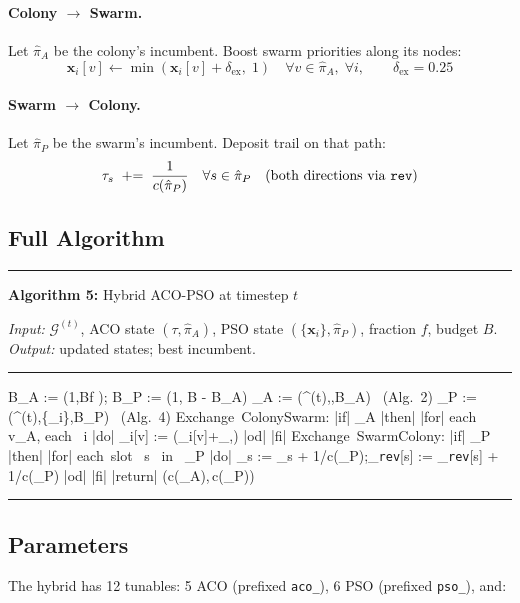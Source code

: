 \documentclass[11pt,a4paper]{article}
\theoremstyle{definition}
\newcommand{\calG}{\mathcal{G}}
\newcommand{\xvec}{\mathbf{x}}
\begin{document}
\paragraph{Colony $\to$ Swarm.}
Let $\hat\pi_A$ be the colony's incumbent.  Boost swarm priorities along its nodes:
\[
  \xvec_i[v]\leftarrow\min(\xvec_i[v]+\delta_{\text{ex}},\;1)
  \quad\forall v\in\hat\pi_A,\;\forall i,\qquad \delta_{\text{ex}}=0.25
\]

\paragraph{Swarm $\to$ Colony.}
Let $\hat\pi_P$ be the swarm's incumbent.  Deposit trail on that path:
\[
  \tau_s\;\mathrel{+}=\;\frac{1}{c(\hat\pi_P)}\quad\forall s\in\hat\pi_P
  \quad\text{(both directions via \texttt{rev})}
\]

\subsection{Full Algorithm}

\begin{center}
\begin{minipage}{0.88\linewidth}
\hrule\medskip
\textbf{Algorithm 5:} Hybrid ACO-PSO at timestep $t$

\smallskip\textit{Input:} $\calG^{(t)}$, ACO state $(\tau,\hat\pi_A)$,
PSO state $(\{\xvec_i\},\hat\pi_P)$, fraction $f$, budget $B$.
\textit{Output:} updated states; best incumbent.
\hrule\medskip
\begin{program}
B_A := \max(1,\lfloor Bf \rceil);\; B_P := \max(1, B - B_A)
\hat\pi_A := (\calG^{(t)},\tau,B_A) \mbox{ (Alg.\ 2)}
\hat\pi_P := (\calG^{(t)},\{\xvec_i\},B_P) \mbox{ (Alg.\ 4)}
\mbox{Exchange Colony}\to\mbox{Swarm:}
|if| \hat\pi_A \ne {} |then|
  |for| \mbox{each } v\in\hat\pi_A, \mbox{each } i |do|
    \xvec_i[v] := \min(\xvec_i[v]+\delta_{},)
  |od|
|fi|
\mbox{Exchange Swarm}\to\mbox{Colony:}
|if| \hat\pi_P \ne {} |then|
  |for| \mbox{each slot } s \mbox{ in } \hat\pi_P |do|
    \tau_s := \tau_s + 1/c(\hat\pi_P);\;\tau_{\texttt{rev}[s]} := \tau_{\texttt{rev}[s]} + 1/c(\hat\pi_P)
  |od|
|fi|
|return| \arg\min(c(\hat\pi_A),\,c(\hat\pi_P))
\end{program}
\hrule
\end{minipage}
\end{center}

\subsection{Parameters}
The hybrid has 12 tunables: 5 ACO (prefixed \texttt{aco\_}), 6 PSO (prefixed
\texttt{pso\_}), and:
\end{document}
